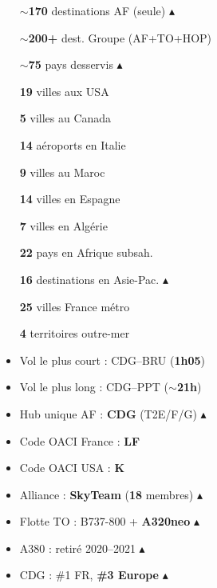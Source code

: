\documentclass[9pt,a4paper,landscape]{article}
\newcommand{\CORR}{\textcolor{afred}{$\blacktriangle$}}
\begin{document}
\vspace{0.3cm}
\begin{tcolorbox}[colback=aflight,colframe=afblue,title={\textbf{STATISTIQUES RÉSEAU --- À RETENIR POUR LE PSY0 \CORR}},fonttitle=\bfseries\color{white}]
\begin{multicols}{3}
\scriptsize
\begin{itemize}\setlength\itemsep{0pt}
\item[\textbf{$\sim$170}] destinations AF (seule) \CORR
\item[\textbf{$\sim$200+}] dest. Groupe (AF+TO+HOP)
\item[\textbf{$\sim$75}] pays desservis \CORR
\item[\textbf{19}] villes aux USA
\item[\textbf{5}] villes au Canada
\item[\textbf{14}] aéroports en Italie
\item[\textbf{9}] villes au Maroc
\item[\textbf{14}] villes en Espagne
\item[\textbf{7}] villes en Algérie
\item[\textbf{22}] pays en Afrique subsah.
\item[\textbf{16}] destinations en Asie-Pac. \CORR
\item[\textbf{25}] villes France métro
\item[\textbf{4}] territoires outre-mer
\item Vol le plus court : CDG--BRU (\textbf{1h05})
\item Vol le plus long : CDG--PPT (\textbf{$\sim$21h})
\item Hub unique AF : \textbf{CDG} (T2E/F/G) \CORR
\item Code OACI France : \textbf{LF}
\item Code OACI USA : \textbf{K}
\item Alliance : \textbf{SkyTeam} (\textbf{18} membres) \CORR
\item Flotte TO : B737-800 + \textbf{A320neo} \CORR
\item A380 : retiré 2020--2021 \CORR
\item CDG : \#1 FR, \textbf{\#3 Europe} \CORR
\end{itemize}
\end{multicols}
\end{tcolorbox}
\end{document}
